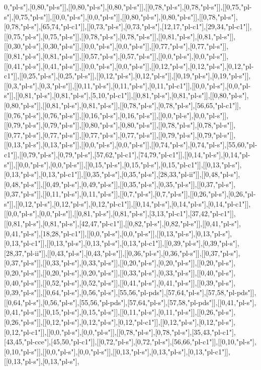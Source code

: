 0,"pl-s"],[0,80,"pl-s"]],[[0,80,"pl-s"],[0,80,"pl-s"]],[[0,78,"pl-s"],[0,78,"pl-s"]],[[0,75,"pl-s"],[0,75,"pl-s"]],[[0,0,"pl-s"],[0,0,"pl-s"]],[[0,80,"pl-s"],[0,80,"pl-s"]],[[0,78,"pl-s"],[0,78,"pl-s"],[65,74,"pl-c1"]],[[0,73,"pl-s"],[0,73,"pl-s"],[12,17,"pl-c1"],[29,34,"pl-c1"]],[[0,75,"pl-s"],[0,75,"pl-s"]],[[0,78,"pl-s"],[0,78,"pl-s"]],[[0,81,"pl-s"],[0,81,"pl-s"]],[[0,30,"pl-s"],[0,30,"pl-s"]],[[0,0,"pl-s"],[0,0,"pl-s"]],[[0,77,"pl-s"],[0,77,"pl-s"]],[[0,81,"pl-s"],[0,81,"pl-s"]],[[0,57,"pl-s"],[0,57,"pl-s"]],[[0,0,"pl-s"],[0,0,"pl-s"]],[[0,41,"pl-s"],[0,41,"pl-s"]],[[0,0,"pl-s"],[0,0,"pl-s"]],[[0,12,"pl-s"],[0,12,"pl-s"],[0,12,"pl-c1"]],[[0,25,"pl-s"],[0,25,"pl-s"]],[[0,12,"pl-s"],[0,12,"pl-s"]],[[0,19,"pl-s"],[0,19,"pl-s"]],[[0,3,"pl-s"],[0,3,"pl-s"]],[[0,11,"pl-s"],[0,11,"pl-s"],[0,11,"pl-c1"]],[[0,0,"pl-s"],[0,0,"pl-s"]],[[0,81,"pl-s"],[0,81,"pl-s"],[5,10,"pl-c1"]],[[0,81,"pl-s"],[0,81,"pl-s"]],[[0,80,"pl-s"],[0,80,"pl-s"]],[[0,81,"pl-s"],[0,81,"pl-s"]],[[0,78,"pl-s"],[0,78,"pl-s"],[56,65,"pl-c1"]],[[0,76,"pl-s"],[0,76,"pl-s"]],[[0,16,"pl-s"],[0,16,"pl-s"]],[[0,0,"pl-s"],[0,0,"pl-s"]],[[0,79,"pl-s"],[0,79,"pl-s"]],[[0,80,"pl-s"],[0,80,"pl-s"]],[[0,78,"pl-s"],[0,78,"pl-s"]],[[0,77,"pl-s"],[0,77,"pl-s"]],[[0,77,"pl-s"],[0,77,"pl-s"]],[[0,79,"pl-s"],[0,79,"pl-s"]],[[0,13,"pl-s"],[0,13,"pl-s"]],[[0,0,"pl-s"],[0,0,"pl-s"]],[[0,74,"pl-s"],[0,74,"pl-s"],[55,60,"pl-c1"]],[[0,79,"pl-s"],[0,79,"pl-s"],[57,62,"pl-c1"],[74,79,"pl-c1"]],[[0,14,"pl-s"],[0,14,"pl-s"]],[[0,0,"pl-s"],[0,0,"pl-s"]],[[0,15,"pl-s"],[0,15,"pl-s"],[0,15,"pl-c1"]],[[0,13,"pl-s"],[0,13,"pl-s"],[0,13,"pl-c1"]],[[0,35,"pl-s"],[0,35,"pl-s"],[28,33,"pl-ii"]],[[0,48,"pl-s"],[0,48,"pl-s"]],[[0,49,"pl-s"],[0,49,"pl-s"]],[[0,35,"pl-s"],[0,35,"pl-s"]],[[0,37,"pl-s"],[0,37,"pl-s"]],[[0,11,"pl-s"],[0,11,"pl-s"]],[[0,7,"pl-s"],[0,7,"pl-s"]],[[0,26,"pl-s"],[0,26,"pl-s"]],[[0,12,"pl-s"],[0,12,"pl-s"],[0,12,"pl-c1"]],[[0,14,"pl-s"],[0,14,"pl-s"],[0,14,"pl-c1"]],[[0,0,"pl-s"],[0,0,"pl-s"]],[[0,81,"pl-s"],[0,81,"pl-s"],[3,13,"pl-c1"],[37,42,"pl-c1"]],[[0,81,"pl-s"],[0,81,"pl-s"],[42,47,"pl-c1"]],[[0,82,"pl-s"],[0,82,"pl-s"]],[[0,41,"pl-s"],[0,41,"pl-s"],[18,28,"pl-c1"]],[[0,0,"pl-s"],[0,0,"pl-s"]],[[0,13,"pl-s"],[0,13,"pl-s"],[0,13,"pl-c1"]],[[0,13,"pl-s"],[0,13,"pl-s"],[0,13,"pl-c1"]],[[0,39,"pl-s"],[0,39,"pl-s"],[28,37,"pl-ii"]],[[0,43,"pl-s"],[0,43,"pl-s"]],[[0,36,"pl-s"],[0,36,"pl-s"]],[[0,37,"pl-s"],[0,37,"pl-s"]],[[0,33,"pl-s"],[0,33,"pl-s"]],[[0,20,"pl-s"],[0,20,"pl-s"]],[[0,20,"pl-s"],[0,20,"pl-s"]],[[0,20,"pl-s"],[0,20,"pl-s"]],[[0,33,"pl-s"],[0,33,"pl-s"]],[[0,40,"pl-s"],[0,40,"pl-s"]],[[0,52,"pl-s"],[0,52,"pl-s"]],[[0,41,"pl-s"],[0,41,"pl-s"]],[[0,39,"pl-s"],[0,39,"pl-s"]],[[0,64,"pl-s"],[0,56,"pl-s"],[55,56,"pl-pds"],[57,64,"pl-s"],[57,58,"pl-pds"]],[[0,64,"pl-s"],[0,56,"pl-s"],[55,56,"pl-pds"],[57,64,"pl-s"],[57,58,"pl-pds"]],[[0,41,"pl-s"],[0,41,"pl-s"]],[[0,15,"pl-s"],[0,15,"pl-s"]],[[0,11,"pl-s"],[0,11,"pl-s"]],[[0,26,"pl-s"],[0,26,"pl-s"]],[[0,12,"pl-s"],[0,12,"pl-s"],[0,12,"pl-c1"]],[[0,12,"pl-s"],[0,12,"pl-s"],[0,12,"pl-c1"]],[[0,0,"pl-s"],[0,0,"pl-s"]],[[0,78,"pl-s"],[0,78,"pl-s"],[35,43,"pl-c1"],[43,45,"pl-cce"],[45,50,"pl-c1"]],[[0,72,"pl-s"],[0,72,"pl-s"],[56,66,"pl-c1"]],[[0,10,"pl-s"],[0,10,"pl-s"]],[[0,0,"pl-s"],[0,0,"pl-s"]],[[0,13,"pl-s"],[0,13,"pl-s"],[0,13,"pl-c1"]],[[0,13,"pl-s"],[0,13,"pl-s"],